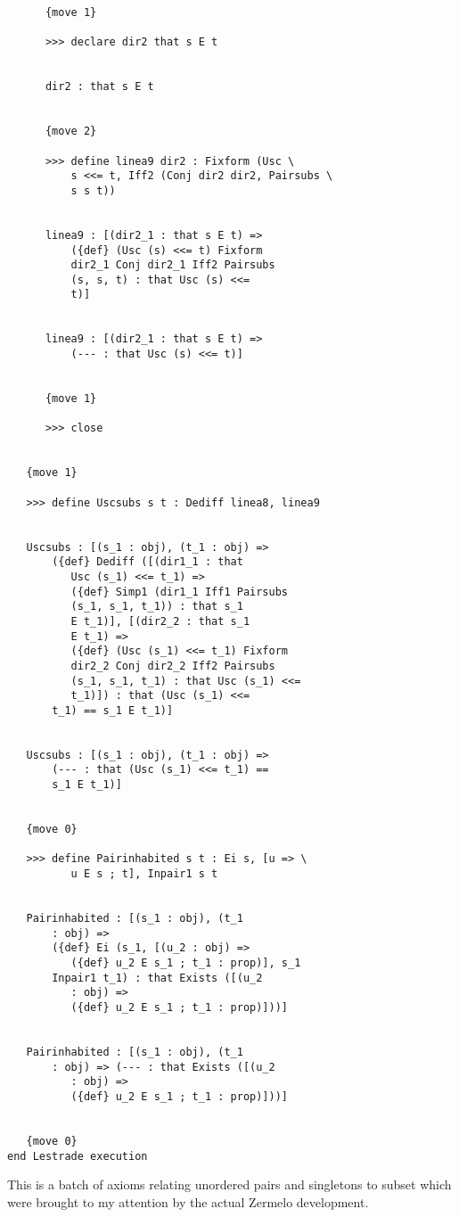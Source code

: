 \documentclass[12pt]{article}
\begin{document}
\begin{verbatim}
      {move 1}

      >>> declare dir2 that s E t


      dir2 : that s E t


      {move 2}

      >>> define linea9 dir2 : Fixform (Usc \
          s <<= t, Iff2 (Conj dir2 dir2, Pairsubs \
          s s t))


      linea9 : [(dir2_1 : that s E t) => 
          ({def} (Usc (s) <<= t) Fixform 
          dir2_1 Conj dir2_1 Iff2 Pairsubs 
          (s, s, t) : that Usc (s) <<= 
          t)]


      linea9 : [(dir2_1 : that s E t) => 
          (--- : that Usc (s) <<= t)]


      {move 1}

      >>> close


   {move 1}

   >>> define Uscsubs s t : Dediff linea8, linea9


   Uscsubs : [(s_1 : obj), (t_1 : obj) => 
       ({def} Dediff ([(dir1_1 : that 
          Usc (s_1) <<= t_1) => 
          ({def} Simp1 (dir1_1 Iff1 Pairsubs 
          (s_1, s_1, t_1)) : that s_1 
          E t_1)], [(dir2_2 : that s_1 
          E t_1) => 
          ({def} (Usc (s_1) <<= t_1) Fixform 
          dir2_2 Conj dir2_2 Iff2 Pairsubs 
          (s_1, s_1, t_1) : that Usc (s_1) <<= 
          t_1)]) : that (Usc (s_1) <<= 
       t_1) == s_1 E t_1)]


   Uscsubs : [(s_1 : obj), (t_1 : obj) => 
       (--- : that (Usc (s_1) <<= t_1) == 
       s_1 E t_1)]


   {move 0}

   >>> define Pairinhabited s t : Ei s, [u => \
          u E s ; t], Inpair1 s t


   Pairinhabited : [(s_1 : obj), (t_1 
       : obj) => 
       ({def} Ei (s_1, [(u_2 : obj) => 
          ({def} u_2 E s_1 ; t_1 : prop)], s_1 
       Inpair1 t_1) : that Exists ([(u_2 
          : obj) => 
          ({def} u_2 E s_1 ; t_1 : prop)]))]


   Pairinhabited : [(s_1 : obj), (t_1 
       : obj) => (--- : that Exists ([(u_2 
          : obj) => 
          ({def} u_2 E s_1 ; t_1 : prop)]))]


   {move 0}
end Lestrade execution
\end{verbatim}

This is a batch of axioms relating unordered pairs and singletons to subset which were brought to my attention by the actual Zermelo development.
\end{document}
